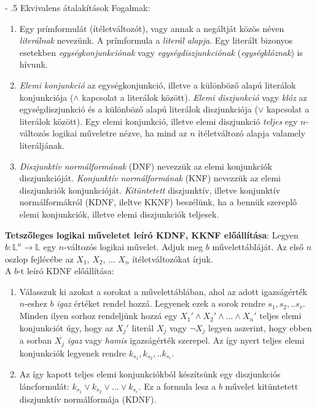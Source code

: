 \documentclass[margin=0px]{article}
\makeatletter
\renewcommand\paragraph{%
	\@startsection{paragraph}{4}{0mm}%
	{-\baselineskip}%
	{.5\baselineskip}%
	{\normalfont\normalsize\bfseries}}
\makeatother
\begin{document}
	\paragraph{Ekvivalens átalakítások}
	Fogalmak:
	\begin{enumerate}
		\item	Egy prímformulát (ítéletváltozót), vagy annak a negáltját közös néven \textit{literálnak} nevezünk. A prímformula
		a \textit{literál alapja}. Egy literált bizonyos esetekben \textit{egységkonjunkciónak} vagy \textit{egységdiszjunkciónak}
		(\textit{egységklóznak}) is hívunk.
		
		\item	\textit{Elemi konjunkció} az egységkonjunkció, illetve a különböző alapú literálok konjunkciója ($\wedge$ kapcsolat
		a literálok között). \textit{Elemi diszjunkció} vagy \textit{klóz} az egységdiszjunkció és a különböző alapú literálok
		diszjunkciója ($\vee$ kapcsolat a literálok között). Egy elemi konjunkció, illetve elemi diszjunkció \textit{teljes}
		egy $n$-változós logikai műveletre nézve, ha mind az $n$ ítéletváltozó alapja valamely literáljának.
		
		\item	\textit{Diszjunktív normálformának} (DNF) nevezzük az elemi konjunkciók diszjunkcióját. 
		\textit{Konjunktív normálformának} (KNF) nevezzük az elemi diszjunkciók konjunkcióját. \textit{Kitüntetett}
		diszjunktív, illetve konjunktív normálformákról (KDNF, ileltve KKNF) beszélünk, ha a bennük szereplő
		elemi konjunkciók, illetve elemi diszjunkciók teljesek.
	
	\end{enumerate}	
	
	\noindent \textbf{Tetszőleges logikai műveletet leíró KDNF, KKNF előállítása}:	Legyen $b: \mathbb{L}^{n} \to \mathbb{L}$
	egy $n$-változós logikai művelet. Adjuk meg $b$ művelettábláját.
	Az első $n$ oszlop fejlécébe az $X_{1}$, $X_{2}$, ... $X_{n}$ ítéletváltozókat írjuk.\\
	
	\noindent A $b$-t leíró KDNF előállítása:
	
	\begin{enumerate}
		\item	Válasszuk ki azokat a sorokat a művelettáblában, ahol az adott igazságérték $n$-eshez $b$ \textit{igaz}
		értéket rendel hozzá. Legyenek ezek a sorok rendre $s_{1}, s_{2}, .. s_{r}$. Minden ilyen sorhoz rendeljünk
		hozzá egy $X_{1}' \wedge X_{2}' \wedge ... \wedge X_{n}'$ teljes elemi konjunkciót úgy, hogy az $X_{j}'$ literál
		$X_{j}$ vagy $\neg X_{j}$ legyen aszerint, hogy ebben a sorban $X_{j}$ \textit{igaz} vagy \textit{hamis} igazságérték
		szerepel. Az így nyert teljes elemi konjunkciók legyenek rendre $k_{s_{1}}, k_{s_{2}}, .. k_{s_{r}}$.
		
		\item	Az így kapott teljes elemi konjunkciókból készítsünk egy diszjunkciós láncformulát:
		$k_{s_{1}} \vee k_{s_{2}} \vee ... \vee k_{s_{r}}$. Ez a formula lesz a $b$ művelet kitüntetett diszjunktív
		normálformája (KDNF).
	\end{enumerate}
	
\end{document}
